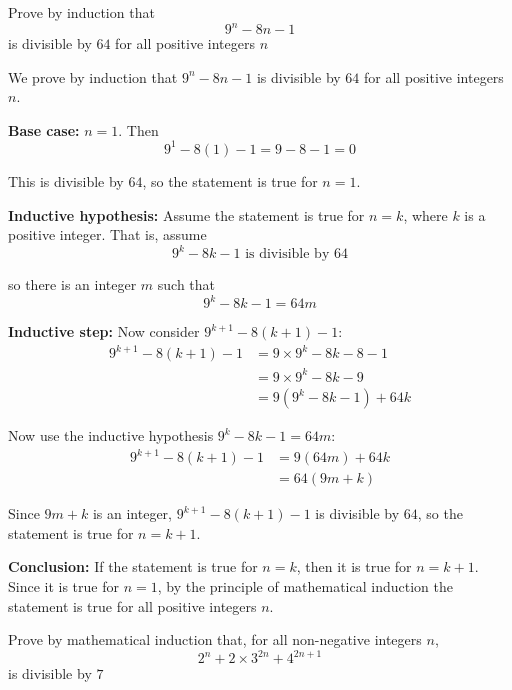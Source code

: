 \documentclass[leqno]{article}
\begin{document}
\begin{enumerate}[
  label=\textbf{\arabic*.},
  leftmargin=*,
  topsep=0pt,
  partopsep=0pt,
  parsep=0pt
]
\newpage

\questionitem

Prove by induction that \[9^n-8n-1\] is divisible by $64$ for all positive integers $n$ 

\vspace*{10pt}

\begin{djsSolution}
We prove by induction that \(9^n-8n-1\) is divisible by \(64\) for all positive integers \(n\).

\textbf{Base case:} \(n=1\). Then
\[
9^1-8(1)-1=9-8-1=0
\]

This is divisible by \(64\), so the statement is true for \(n=1\).

\textbf{Inductive hypothesis:} Assume the statement is true for \(n=k\), where \(k\) is a positive integer. That is, assume
\[
9^k-8k-1 \text{ is divisible by } 64
\]

so there is an integer \(m\) such that
\[
9^k-8k-1=64m
\]

\textbf{Inductive step:} Now consider \(9^{k+1}-8(k+1)-1\):
\begin{align*}
9^{k+1}-8(k+1)-1
&= 9\times 9^k-8k-8-1 \\
&= 9\times 9^k-8k-9 \\
&= 9(9^k-8k-1)+64k
\end{align*}

Now use the inductive hypothesis \(9^k-8k-1=64m\):
\begin{align*}
9^{k+1}-8(k+1)-1
&= 9(64m)+64k \\
&= 64(9m+k)
\end{align*}

Since \(9m+k\) is an integer, \(9^{k+1}-8(k+1)-1\) is divisible by \(64\), so the statement is true for \(n=k+1\).

\textbf{Conclusion:} If the statement is true for \(n=k\), then it is true for \(n=k+1\). Since it is true for \(n=1\), by the principle of mathematical induction the statement is true for all positive integers \(n\).
\end{djsSolution}


\newpage

\questionitem

Prove by mathematical induction that, for all non-negative integers $n$,
\[
2^n+2\times 3^{2n}+4^{2n+1}
\]
is divisible by $7$ 


\end{enumerate}
\end{document}
